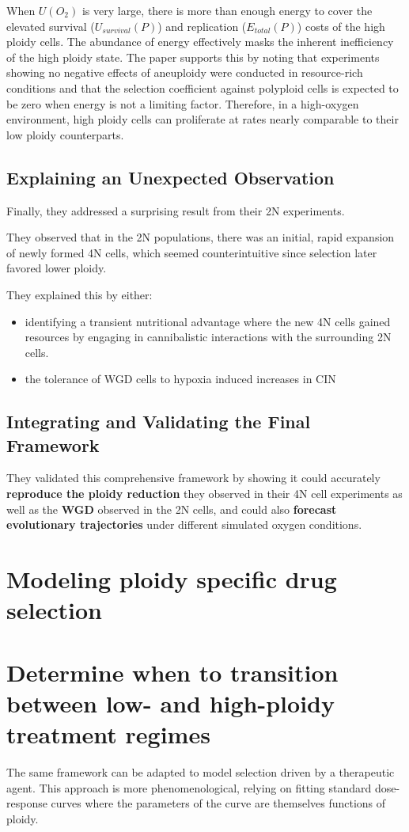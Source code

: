 \documentclass{article}
\begin{document}
When $U(O_2)$ is very large, there is more than enough energy to cover the elevated survival ($U_{survival}(P)$) and replication ($E_{total}(P)$) costs of the high ploidy cells. The abundance of energy effectively masks the inherent inefficiency of the high ploidy state. The paper supports this by noting that experiments showing no negative effects of aneuploidy were conducted in resource-rich conditions and that the selection coefficient against polyploid cells is expected to be zero when energy is not a limiting factor. Therefore, in a high-oxygen environment, high ploidy cells can proliferate at rates nearly comparable to their low ploidy counterparts.


\subsection{Explaining an Unexpected Observation}
Finally, they addressed a surprising result from their 2N experiments.

They observed that in the 2N populations, there was an initial, rapid expansion of newly formed 4N cells, which seemed counterintuitive since selection later favored lower ploidy.

They explained this by either:
\color{blue}
\begin{itemize}
    \item identifying a transient nutritional advantage where the new 4N cells gained resources by engaging in cannibalistic interactions with the surrounding 2N cells.
    \item the tolerance of WGD cells to hypoxia induced increases in CIN
\end{itemize}
\color{black}

\subsection{Integrating and Validating the Final Framework}
\color{blue}
 They validated this comprehensive framework by showing it could accurately \textbf{reproduce the ploidy reduction} they observed in their 4N cell experiments as well as the \textbf{WGD} observed in the 2N cells, and could also \textbf{forecast evolutionary trajectories} under different simulated oxygen conditions.
\color{black}

\section{Modeling ploidy specific drug selection}
\section{Determine when to transition between low- and high-ploidy treatment regimes}
The same framework can be adapted to model selection driven by a therapeutic agent. This approach is more phenomenological, relying on fitting standard dose-response curves where the parameters of the curve are themselves functions of ploidy.
\end{document}
